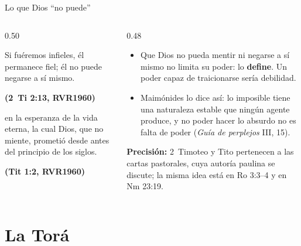 \documentclass[hyperref={bookmarks=false},aspectratio=169]{beamer}
\newcommand{\fuente}[1]{\par\hfill{\upshape\bfseries\footnotesize\textcolor{azul}{#1}}}
\newcommand{\destacar}[1]{\textbf{\textcolor{azul}{#1}}}
\newcommand{\precision}[1]{{\footnotesize\color{gris}\textbf{Precisión:} #1}}
\begin{document}
\begin{frame}{Lo que Dios ``no puede''}
\begin{columns}[t,onlytextwidth]
\begin{column}{0.50\textwidth}
\begin{cita}Si fuéremos infieles, él permanece fiel; él no puede negarse a sí mismo.\fuente{(2~Ti 2:13, RVR1960)}\end{cita}
\begin{cita}en la esperanza de la vida eterna, la cual Dios, que no miente, prometió desde antes del principio de los siglos.\fuente{(Tit 1:2, RVR1960)}\end{cita}
\end{column}
\begin{column}{0.48\textwidth}\small
\begin{itemize}
\item Que Dios no pueda mentir ni negarse a sí mismo no limita su poder: lo \destacar{define}. Un poder capaz de traicionarse sería debilidad.
\item Maimónides lo dice así: lo imposible tiene una naturaleza estable que ningún agente produce, y no poder hacer lo absurdo no es falta de poder (\emph{Guía de perplejos} III, 15).
\end{itemize}
\precision{2~Timoteo y Tito pertenecen a las cartas pastorales, cuya autoría paulina se discute; la misma idea está en Ro 3:3--4 y en Nm 23:19.}
\end{column}
\end{columns}
\end{frame}

\section{La Torá}
\end{document}
